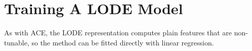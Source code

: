 \documentclass[book.tex]{subfiles}
\begin{document}


\section{Training A LODE Model}

As with ACE, the LODE representation computes plain features that are non-tunable, so the method can be fitted directly with linear regression.



\end{document}
